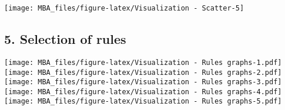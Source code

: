 \documentclass[]{article}
\begin{document}
\begin{center}\texttt{[image: MBA\_files/figure-latex/Visualization - Scatter-5]} \end{center}

\hypertarget{selection-of-rules}{%
\subsection{5. Selection of rules}\label{selection-of-rules}}

\texttt{[image: MBA\_files/figure-latex/Visualization - Rules graphs-1.pdf]}
\texttt{[image: MBA\_files/figure-latex/Visualization - Rules graphs-2.pdf]}
\texttt{[image: MBA\_files/figure-latex/Visualization - Rules graphs-3.pdf]}
\texttt{[image: MBA\_files/figure-latex/Visualization - Rules graphs-4.pdf]}
\texttt{[image: MBA\_files/figure-latex/Visualization - Rules graphs-5.pdf]}
\end{document}
